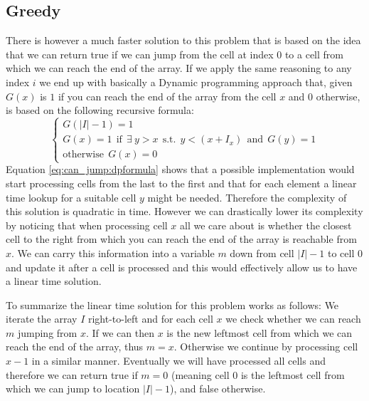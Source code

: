 \subsection{Greedy}
\label{can_jump:sec:DP1}
There is however a much faster solution to this problem that is based on the idea that we can return true if we 
can jump from the cell at index $0$ to a cell from which we can reach the end of the array.
If we apply the same reasoning to any index $i$ we end up with basically a Dynamic programming approach that, 
given $G(x)$ is $1$ if you can reach the end of the array from the cell $x$ and $0$ otherwise,
is based on the following recursive formula:
\begin{equation}
	\begin{cases}
		G(|I|-1) = 1 \\
		G(x) = 1 \: \: \text{if} \: \: \exists \: y > x \:\: \text{s.t.} \:\: y < (x+I_x) \: \: \text{and} \: \:G(y) = 1\\
		\text{otherwise} \: \: G(x) = 0
	 \end{cases}
	\label{eq:can_jump:dpformula}
\end{equation}
Equation \ref{eq:can_jump:dpformula} shows that a possible implementation would start processing cells from the last to the first
and that for each element a linear time lookup for a suitable cell $y$ might be needed. Therefore the complexity of this solution is quadratic in time.
However we can drastically lower its complexity by noticing that when processing cell $x$ all we care about is whether the closest cell to the right from which you can reach the end of the array
is reachable from $x$. 
We can carry this information into a variable $m$ down from cell $|I|-1$ to cell $0$ and update it after a cell is processed and this would effectively allow us to have a linear time solution.

To summarize the linear time solution for this problem works as follows:
We iterate the array $I$ right-to-left and for each cell $x$ we check whether we can reach $m$ jumping from $x$. If we can then $x$ is the new leftmost cell from which we can reach the end of the array, thus $m = x$.
Otherwise we continue by processing cell $x-1$ in a similar manner. Eventually we will have processed all cells and therefore we can return true if $m = 0$ (meaning cell $0$ is the leftmost cell from which we can jump to location $|I|-1$), and false otherwise.



